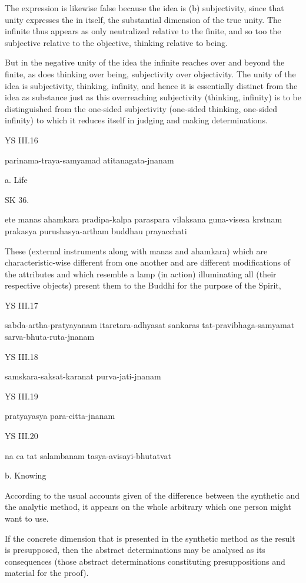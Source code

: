 The expression is likewise false
because the idea is (b) subjectivity,
since that unity expresses the in itself,
the substantial dimension of the true unity.
The infinite thus appears as only neutralized relative to the finite,
and so too the subjective relative to the objective,
thinking relative to being.

But in the negative unity of the idea the infinite reaches over and beyond
the finite, as does thinking over being, subjectivity over objectivity.
The unity of the idea is subjectivity, thinking, infinity, and hence it is
essentially distinct from the idea as substance just as this overreaching
subjectivity (thinking, infinity) is to be distinguished from the
one-sided subjectivity (one-sided thinking, one-sided infinity) to
which it reduces itself in judging and making determinations.

YS III.16

parinama-traya-samyamad atitanagata-jnanam

a. Life

SK 36.

ete manas ahamkara pradipa-kalpa paraspara vilaksana
guna-visesa krstnam prakasya purushasya-artham buddhau prayacchati

These (external instruments along with manas and ahamkara)
which are characteristic-wise different from one another
and are different modifications of the attributes
and which resemble a lamp (in action) illuminating all (their respective objects)
present them to the Buddhi for the purpose of the Spirit,

YS III.17

sabda-artha-pratyayanam itaretara-adhyasat sankaras tat-pravibhaga-samyamat sarva-bhuta-ruta-jnanam

YS III.18

samskara-saksat-karanat purva-jati-jnanam

YS III.19

pratyayasya para-citta-jnanam

YS III.20

na ca tat salambanam tasya-avisayi-bhutatvat

b. Knowing

According to the usual accounts given of the difference
between the synthetic and the analytic method,
it appears on the whole arbitrary which one person might want to use.

If the concrete dimension that is presented in
the synthetic method as the result is presupposed,
then the abstract determinations may be analysed as its consequences
(those abstract determinations constituting presuppositions and
material for the proof).

